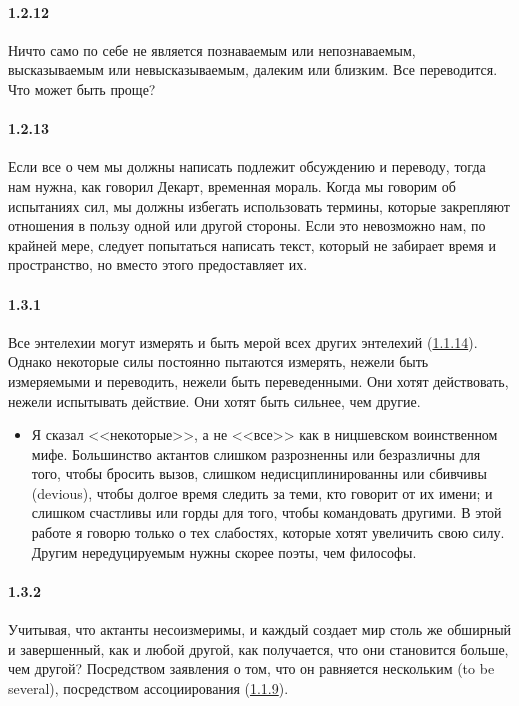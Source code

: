 \paragraph{1.2.12}\hypertarget{par:1.2.12}{} Ничто само по себе не является познаваемым или непознаваемым, высказываемым или невысказываемым, далеким или близким. Все переводится. Что может быть проще?

\paragraph{1.2.13}\hypertarget{par:1.2.13}{} Если все о чем мы должны написать подлежит обсуждению и переводу, тогда нам нужна, как говорил Декарт, временная мораль. Когда мы говорим об испытаниях сил, мы должны избегать использовать термины, которые закрепляют отношения в пользу одной или другой стороны. Если это невозможно нам, по крайней мере, следует попытаться написать текст, который не забирает время и пространство, но вместо этого предоставляет их.

\paragraph{1.3.1}\hypertarget{par:1.3.1}{} Все энтелехии могут измерять и быть мерой всех других энтелехий (\hyperlink{par:1.1.14}{1.1.14}). Однако некоторые силы постоянно пытаются измерять, нежели быть измеряемыми и переводить, нежели быть переведенными. Они хотят действовать, нежели испытывать действие. Они хотят быть сильнее, чем другие.
	\begin{itemize}
	\item Я сказал <<некоторые>>, а не <<все>> как в ницшевском воинственном мифе. Большинство актантов слишком разрозненны или безразличны для того, чтобы бросить вызов, слишком недисциплинированны или сбивчивы (devious), чтобы долгое время следить за теми, кто говорит от их имени; и слишком счастливы или горды для того, чтобы командовать другими. В этой работе я говорю только о тех слабостях, которые хотят увеличить свою силу. Другим нередуцируемым нужны скорее поэты, чем философы.
	\end{itemize}

\paragraph{1.3.2}\hypertarget{par:1.3.2}{} Учитывая, что актанты несоизмеримы, и каждый создает мир столь же обширный и завершенный, как и любой другой, как получается, что они становится больше, чем другой? Посредством заявления о том, что он равняется нескольким (to be several), посредством ассоциирования (\hyperlink{par:1.1.9}{1.1.9}).

